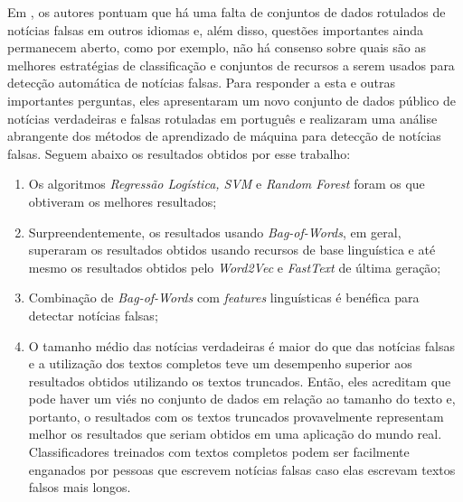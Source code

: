 Em \citet{Silva2020}, os autores pontuam que há uma falta de conjuntos de dados rotulados de notícias falsas em outros idiomas e, além disso, questões importantes ainda permanecem aberto, como por exemplo, não há consenso sobre quais são as melhores estratégias de classificação e conjuntos de recursos a serem usados para detecção automática de notícias falsas. Para responder a esta e outras importantes perguntas, eles apresentaram um novo conjunto de dados público de notícias verdadeiras e falsas rotuladas em português e realizaram uma análise abrangente dos métodos de aprendizado de máquina para detecção de notícias falsas. Seguem abaixo os resultados obtidos por esse trabalho:
\begin{enumerate}
    \item Os algoritmos \textit{ Regressão Logística, SVM} e \textit{Random Forest} foram os que obtiveram os melhores resultados;
    \item Surpreendentemente, os resultados usando \textit{Bag-of-Words}, em geral, superaram os resultados obtidos usando recursos de base linguística e até mesmo os resultados obtidos pelo \textit{Word2Vec} e \textit{FastText} de última geração;
    \item Combinação de \textit{Bag-of-Words} com \textit{features} linguísticas é benéfica para detectar notícias falsas;
    
    \item O tamanho médio das notícias verdadeiras é maior do que das notícias falsas e a utilização dos textos completos teve um desempenho superior aos resultados obtidos utilizando os textos truncados.  Então, eles acreditam que pode haver um viés no conjunto de dados em relação ao tamanho do texto e, portanto, o resultados com os textos truncados provavelmente representam melhor os resultados que seriam obtidos em uma aplicação do mundo real. Classificadores treinados com textos completos podem ser facilmente enganados por pessoas que escrevem notícias falsas caso elas escrevam textos falsos mais longos.
\end{enumerate}



